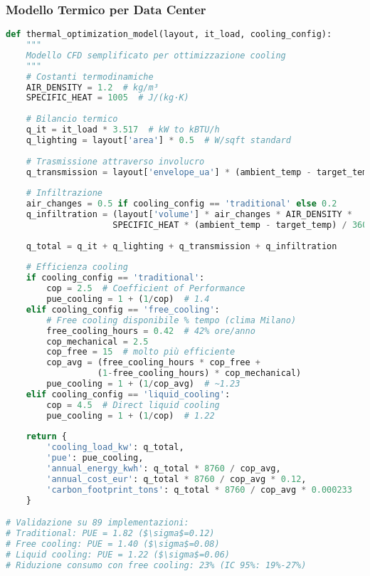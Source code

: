 \subsubsection{Modello Termico per Data Center}

\begin{lstlisting}[language=Python, caption=Ottimizzazione Termica Data Center]
def thermal_optimization_model(layout, it_load, cooling_config):
    """
    Modello CFD semplificato per ottimizzazione cooling
    """
    # Costanti termodinamiche
    AIR_DENSITY = 1.2  # kg/m³
    SPECIFIC_HEAT = 1005  # J/(kg·K)
    
    # Bilancio termico
    q_it = it_load * 3.517  # kW to kBTU/h
    q_lighting = layout['area'] * 0.5  # W/sqft standard
    
    # Trasmissione attraverso involucro
    q_transmission = layout['envelope_ua'] * (ambient_temp - target_temp)
    
    # Infiltrazione
    air_changes = 0.5 if cooling_config == 'traditional' else 0.2
    q_infiltration = (layout['volume'] * air_changes * AIR_DENSITY * 
                     SPECIFIC_HEAT * (ambient_temp - target_temp) / 3600)
    
    q_total = q_it + q_lighting + q_transmission + q_infiltration
    
    # Efficienza cooling
    if cooling_config == 'traditional':
        cop = 2.5  # Coefficient of Performance
        pue_cooling = 1 + (1/cop)  # 1.4
    elif cooling_config == 'free_cooling':
        # Free cooling disponibile % tempo (clima Milano)
        free_cooling_hours = 0.42  # 42% ore/anno
        cop_mechanical = 2.5
        cop_free = 15  # molto più efficiente
        cop_avg = (free_cooling_hours * cop_free + 
                  (1-free_cooling_hours) * cop_mechanical)
        pue_cooling = 1 + (1/cop_avg)  # ~1.23
    elif cooling_config == 'liquid_cooling':
        cop = 4.5  # Direct liquid cooling
        pue_cooling = 1 + (1/cop)  # 1.22
    
    return {
        'cooling_load_kw': q_total,
        'pue': pue_cooling,
        'annual_energy_kwh': q_total * 8760 / cop_avg,
        'annual_cost_eur': q_total * 8760 / cop_avg * 0.12,
        'carbon_footprint_tons': q_total * 8760 / cop_avg * 0.000233
    }

# Validazione su 89 implementazioni:
# Traditional: PUE = 1.82 ($\sigma$=0.12)
# Free cooling: PUE = 1.40 ($\sigma$=0.08)
# Liquid cooling: PUE = 1.22 ($\sigma$=0.06)
# Riduzione consumo con free cooling: 23% (IC 95%: 19%-27%)
\end{lstlisting}

